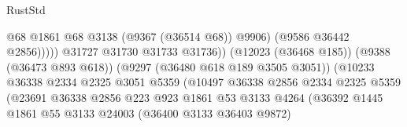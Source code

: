 \begin{lexlean}{RustStd}
\begin{coremodule}
                                                              @68
                                                              @1861
                                                              @68
                                                              @3138
                                                              (@9367 (@36514 @68))
                                                              @9906)
                                                            (@9586 @36442 @2856)))))
                                                    @31727
                                                    @31730
                                                    @31733
                                                    @31736))
                                                (@12023 (@36468 @185))
                                                (@9388 (@36473 @893 @618))
                                                (@9297 (@36480 @618 @189 @3505 @3051))
                                                (@10233
                                                  @36338
                                                  @2334
                                                  @2325
                                                  @3051
                                                  @5359
                                                  (@10497
                                                    @36338
                                                    @2856
                                                    @2334
                                                    @2325
                                                    @5359
                                                    (@23691
                                                      @36338
                                                      @2856
                                                      @223
                                                      @923
                                                      @1861
                                                      @53
                                                      @3133
                                                      @4264
                                                      (@36392
                                                        @1445
                                                        @1861
                                                        @55
                                                        @3133
                                                        @24003
                                                        (@36400 @3133 @36403 @9872)

\end{coremodule}
\end{lexlean}
